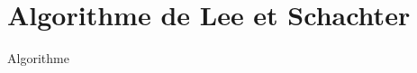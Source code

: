 \documentclass{beamer}
\begin{document}
\section{Algorithme de Lee et Schachter}

\begin{frame}
  \begin{block}{Algorithme}
    \begin{overlayarea}{\textwidth}{6cm}

\end{overlayarea}
\end{block}
\end{frame}
\end{document}
